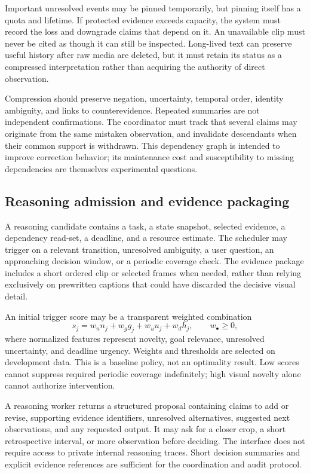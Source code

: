 \documentclass[11pt,letterpaper]{article}
\begin{document}
Important unresolved events may be pinned temporarily, but pinning itself has a quota and lifetime. If protected evidence exceeds capacity, the system must record the loss and downgrade claims that depend on it. An unavailable clip must never be cited as though it can still be inspected. Long-lived text can preserve useful history after raw media are deleted, but it must retain its status as a compressed interpretation rather than acquiring the authority of direct observation.

Compression should preserve negation, uncertainty, temporal order, identity ambiguity, and links to counterevidence. Repeated summaries are not independent confirmations. The coordinator must track that several claims may originate from the same mistaken observation, and invalidate descendants when their common support is withdrawn. This dependency graph is intended to improve correction behavior; its maintenance cost and susceptibility to missing dependencies are themselves experimental questions.

\subsection{Reasoning admission and evidence packaging}
A reasoning candidate contains a task, a state snapshot, selected evidence, a dependency read-set, a deadline, and a resource estimate. The scheduler may trigger on a relevant transition, unresolved ambiguity, a user question, an approaching decision window, or a periodic coverage check. The evidence package includes a short ordered clip or selected frames when needed, rather than relying exclusively on prewritten captions that could have discarded the decisive visual detail.

An initial trigger score may be a transparent weighted combination
\begin{equation}
 s_j=w_n n_j+w_g g_j+w_u u_j+w_d h_j,
 \qquad w_\bullet\geq0,
 \label{eq:trigger}
\end{equation}
where normalized features represent novelty, goal relevance, unresolved uncertainty, and deadline urgency. Weights and thresholds are selected on development data. This is a baseline policy, not an optimality result. Low scores cannot suppress required periodic coverage indefinitely; high visual novelty alone cannot authorize intervention.

A reasoning worker returns a structured proposal containing claims to add or revise, supporting evidence identifiers, unresolved alternatives, suggested next observations, and any requested output. It may ask for a closer crop, a short retrospective interval, or more observation before deciding. The interface does not require access to private internal reasoning traces. Short decision summaries and explicit evidence references are sufficient for the coordination and audit protocol.
\end{document}
